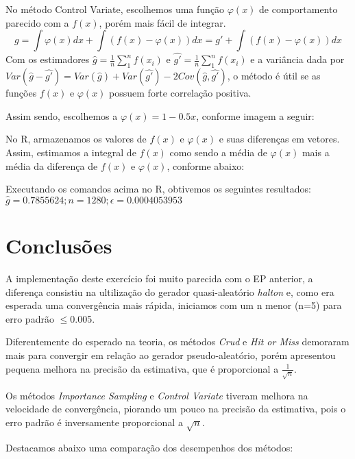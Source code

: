 \documentclass{article}
\begin{document}
No método Control Variate, escolhemos uma função $\varphi(x)$ de comportamento parecido com a $f(x)$, porém mais fácil de integrar.
$$
g = \int \varphi(x)dx + \int( f(x) - \varphi(x))dx  = g' + \int( f(x) - \varphi(x))dx
$$
Com os estimadores $\hat{g} = \frac{1}{n}\sum_{1}^{n}f(x_i)$ e $\hat{g'} = \frac{1}{n}\sum_{1}^{n}f(x_i)$ e a variância dada por $Var(\hat{g} - \hat{g'}) = Var(\hat{g})+Var(\hat{g'})-2Cov(\hat{g}, \hat{g'})$, o método é útil se as funções $f(x)$ e $\varphi(x)$ possuem forte correlação positiva.


Assim sendo, escolhemos a $\varphi(x) = 1 - 0.5x$, conforme imagem a seguir:


No R, armazenamos os valores de $f(x)$ e $\varphi(x)$ e suas diferenças em vetores. Assim, estimamos a integral de $f(x)$ como sendo a média de $\varphi(x)$  mais a média da diferença de $f(x)$ e $\varphi(x)$, conforme abaixo:
 
Executando os comandos acima no R, obtivemos os seguintes resultados:\\
$\hat{g} = 0.7855624; n = 1280;    \epsilon = 0.0004053953$

\section{Conclusões}

A implementação deste exercício foi muito parecida com o EP anterior, a diferença consistiu na ultilização do gerador quasi-aleatório \textit{halton} e, como era esperada uma convergência mais rápida, iniciamos com um n menor (n=5) para erro padrão $\leq$0.005.


Diferentemente do esperado na teoria, os métodos \textit{Crud} e \textit{Hit or Miss} demoraram mais para convergir em relação ao gerador pseudo-aleatório, porém apresentou pequena melhora na precisão da estimativa, que é proporcional a $\frac{1}{\sqrt{n}}$.


Os métodos \textit{Importance Sampling} e \textit{Control Variate} tiveram melhora na velocidade de convergência, piorando um pouco na precisão da estimativa, pois o erro padrão é inversamente proporcional a $\sqrt{n}$.

Destacamos abaixo uma comparação dos desempenhos dos métodos:
\end{document}
